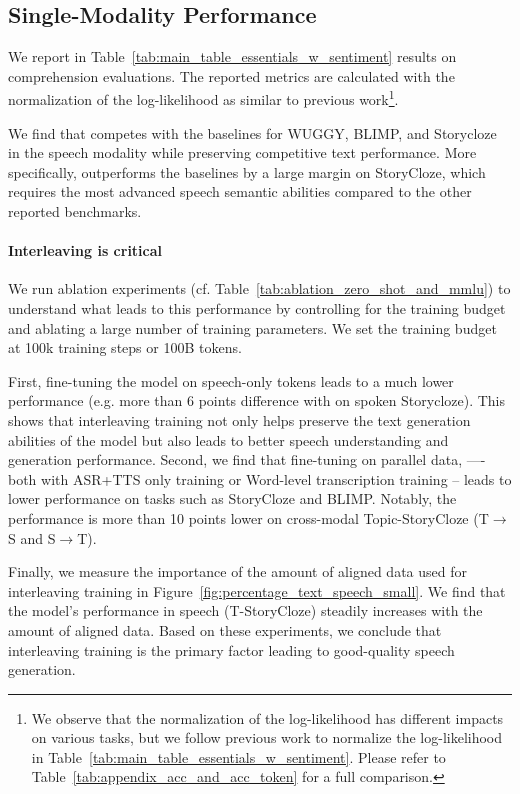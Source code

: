 \subsection{Single-Modality Performance}
We report in Table~\ref{tab:main_table_essentials_w_sentiment} results on comprehension evaluations.
The reported metrics are calculated with the normalization of the log-likelihood as similar to previous work\footnote{We observe that the normalization of the log-likelihood has different impacts on various tasks, but we follow previous work to normalize the log-likelihood in Table~\ref{tab:main_table_essentials_w_sentiment}. Please refer to Table~\ref{tab:appendix_acc_and_acc_token} for a full comparison.}.

We find that \spotbase competes with the baselines for WUGGY, BLIMP, and Storycloze in the speech modality while preserving competitive text performance.
More specifically, \spotbase outperforms the baselines by a large margin on StoryCloze, which requires the most advanced speech semantic abilities compared to the other reported benchmarks. 

\paragraph{Interleaving is critical} We run ablation experiments (cf. Table~\ref{tab:ablation_zero_shot_and_mmlu}) to understand what leads to this performance by controlling for the training budget and ablating a large number of training parameters. We set the training budget at 100k training steps or 100B tokens. 

First, fine-tuning the model on speech-only tokens leads to a much lower performance (e.g. more than 6 points difference with \spot on spoken Storycloze). This shows that interleaving training not only helps preserve the text generation abilities of the model but also leads to better speech understanding and generation performance. Second, we find that fine-tuning \llamatwo on parallel data, ---- both with ASR+TTS only training or Word-level transcription training -- leads to lower performance on tasks such as StoryCloze and BLIMP. Notably, 
the performance is more than 10 points lower on cross-modal Topic-StoryCloze (T$\rightarrow$S and S$\rightarrow$T).

 Finally, we measure the importance of the amount of aligned data used for interleaving training in Figure~\ref{fig:percentage_text_speech_small}. We find that the model's performance in speech (T-StoryCloze) steadily increases with the amount of aligned data. 
Based on these experiments, we conclude that interleaving training is the primary factor leading to good-quality speech generation. 

